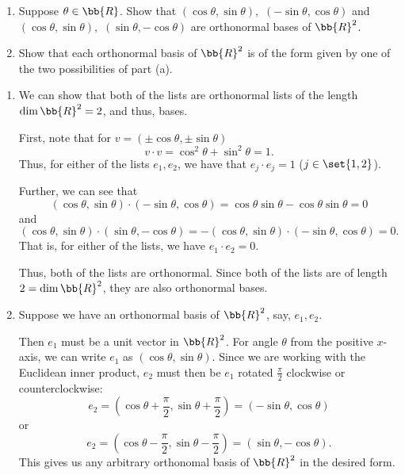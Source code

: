 \documentclass[12pt, letterpaper]{hmcpset}
\begin{document}
\begin{problem}[1]
	\begin{enumerate}
		\item
			Suppose $\theta \in \bb{R}$. Show that $(\cos{\theta}, \sin{\theta}),$ $(-\sin{\theta}, \cos{\theta})$ and $(\cos{\theta}, \sin{\theta}),$ $(\sin{\theta}, - \cos{\theta})$ are orthonormal bases of $\bb{R}^2$.
		\item
			Show that each orthonormal basis of $\bb{R}^2$ is of the form given by one of the two possibilities of part (a).
	\end{enumerate}
\end{problem}

\begin{solution}
	\begin{enumerate}
		\item
			We can show that both of the lists are orthonormal lists of the length $\dim \bb{R}^2 = 2$, and thus, bases.

			First, note that for $v = (\pm \cos{\theta}, \pm \sin{\theta})$
			\[
				v \cdot v = \cos^2{\theta} + \sin^2{\theta} = 1.
			\]
			Thus, for either of the lists $e_1, e_2$, we have that $e_j \cdot e_j = 1$ ($j \in \set{1, 2}$).

			Further, we can see that 
			\[
				(\cos{\theta}, \sin{\theta}) \cdot (- \sin{\theta}, \cos{\theta}) = \cos{\theta} \sin{\theta} - \cos{\theta} \sin{\theta} = 0
			\]
			and
			\[
				(\cos{\theta}, \sin{\theta}) \cdot (\sin{\theta}, -\cos{\theta}) = -(\cos{\theta}, \sin{\theta}) \cdot (- \sin{\theta}, \cos{\theta}) = 0.
			\]
			That is, for either of the lists, we have $e_1 \cdot e_2 = 0$.

			Thus, both of the lists are orthonormal. Since both of the lists are of length $2 = \dim \bb{R}^2$, they are also orthonormal bases.
		\item
			Suppose we have an orthonormal basis of $\bb{R}^2$, say, $e_1, e_2$.

			Then $e_1$ must be a unit vector in $\bb{R}^2$. For angle $\theta$ from the positive $x$-axis, we can write $e_1$ as $(\cos{\theta}, \sin{\theta})$. Since we are working with the Euclidean inner product, $e_2$ must then be $e_1$ rotated $\frac{\pi}{2}$ clockwise or counterclockwise:
			\[
				e_2 = (\cos{\theta + \frac{\pi}{2}}, \sin{\theta + \frac{\pi}{2}}) = (-\sin{\theta}, \cos{\theta})
			\]
			or
			\[
				e_2 = (\cos{\theta - \frac{\pi}{2}}, \sin{\theta - \frac{\pi}{2}}) = (\sin{\theta}, -\cos{\theta}).
			\]
			This gives us any arbitrary orthonomal basis of $\bb{R}^2$ in the desired form.
	\end{enumerate}
\end{solution}
\end{document}
